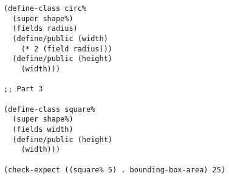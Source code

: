 \documentclass[12pt]{article}                   %
\newenvironment{solution}{}{}
\begin{document}
\begin{problem}
\begin{solution}
\begin{verbatim}
(define-class circ% 
  (super shape%)
  (fields radius)
  (define/public (width)
    (* 2 (field radius)))
  (define/public (height)
    (width)))

;; Part 3
    
(define-class square%
  (super shape%)
  (fields width)
  (define/public (height)
    (width)))

(check-expect ((square% 5) . bounding-box-area) 25)
\end{verbatim}
\end{solution}

\newpage
\ifrubric{}
\newpage
\fi

\end{problem}
\end{document}
